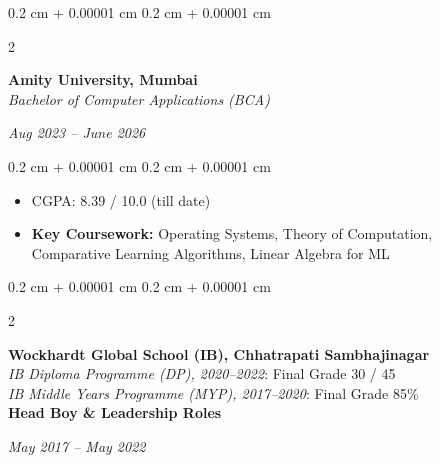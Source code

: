 \documentclass[10pt, letterpaper]{article}
\newenvironment{highlights}{
    \begin{itemize}[
        topsep=0.10 cm,
        parsep=0.10 cm,
        partopsep=0pt,
        itemsep=0pt,
        leftmargin=0.4 cm + 10pt
    ]
}{
    \end{itemize}
} %
\newenvironment{onecolentry}{
    \begin{adjustwidth}{
        0.2 cm + 0.00001 cm
    }{
        0.2 cm + 0.00001 cm
    }
}{
    \end{adjustwidth}
} %
\newenvironment{twocolentry}[2][]{
    \onecolentry
    \def\secondColumn{#2}
    \setcolumnwidth{\fill, 4.5 cm}
    \begin{paracol}{2}
}{
    \switchcolumn \raggedleft \secondColumn
    \end{paracol}
    \endonecolentry
} %
\begin{document}
        \vspace{0.2cm}

        \begin{twocolentry}{
            \textit{Aug 2023 – June 2026}}
            \textbf{Amity University, Mumbai} \\
            \textit{Bachelor of Computer Applications (BCA)}
        \end{twocolentry}
        
        \vspace{0.1cm}
        
        \begin{onecolentry}
            \begin{highlights}
                \item CGPA: 8.39 / 10.0 (till date)
                \item \textbf{Key Coursework:} Operating Systems, Theory of Computation, Comparative Learning Algorithms, Linear Algebra for ML
            \end{highlights}
        \end{onecolentry}

        \vspace{0.2cm}
        
        \begin{twocolentry}{
            \textit{May 2017 – May 2022}}
            \textbf{Wockhardt Global School (IB), Chhatrapati Sambhajinagar} \\
            \textit{IB Diploma Programme (DP), 2020–2022}: Final Grade 30 / 45 \\
            \textit{IB Middle Years Programme (MYP), 2017–2020}: Final Grade 85\% \\
            \textbf{Head Boy \& Leadership Roles}
        \end{twocolentry}
        
        \vspace{0.1cm}
        
\end{document}
